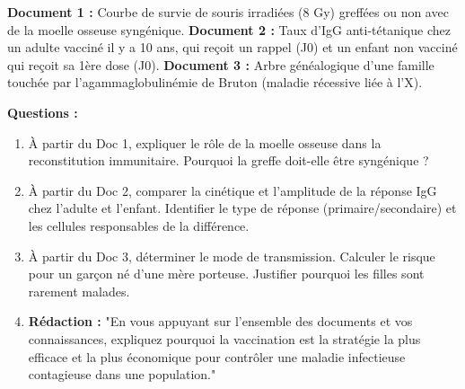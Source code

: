 \documentclass[11pt]{article}
\begin{document}
\begin{exercice}
\textbf{Document 1 :} Courbe de survie de souris irradiées (8 Gy) greffées ou non avec de la moelle osseuse syngénique.
\textbf{Document 2 :} Taux d'IgG anti-tétanique chez un adulte vacciné il y a 10 ans, qui reçoit un rappel (J0) et un enfant non vacciné qui reçoit sa 1ère dose (J0).
\textbf{Document 3 :} Arbre généalogique d'une famille touchée par l'agammaglobulinémie de Bruton (maladie récessive liée à l'X).

\textbf{Questions :}
\begin{enumerate}
    \item À partir du Doc 1, expliquer le rôle de la moelle osseuse dans la reconstitution immunitaire. Pourquoi la greffe doit-elle être syngénique ?
    \item À partir du Doc 2, comparer la cinétique et l'amplitude de la réponse IgG chez l'adulte et l'enfant. Identifier le type de réponse (primaire/secondaire) et les cellules responsables de la différence.
    \item À partir du Doc 3, déterminer le mode de transmission. Calculer le risque pour un garçon né d'une mère porteuse. Justifier pourquoi les filles sont rarement malades.
    \item \textbf{Rédaction :} "En vous appuyant sur l'ensemble des documents et vos connaissances, expliquez pourquoi la vaccination est la stratégie la plus efficace et la plus économique pour contrôler une maladie infectieuse contagieuse dans une population."
\end{enumerate}
\end{exercice}
\end{document}

